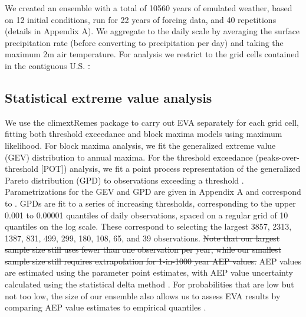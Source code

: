 \documentclass{ametsocV6.1}
\providecommand{\DIFadd}[1]{{\protect\color{blue}\uwave{#1}}} %
\providecommand{\DIFdel}[1]{{\protect\color{red}\sout{#1}}}                      %
\providecommand{\DIFaddbegin}{} %
\providecommand{\DIFaddend}{} %
\providecommand{\DIFdelbegin}{} %
\providecommand{\DIFdelend}{} %
\newcommand{\DIFscaledelfig}{0.5}
\newlength{\DIFdelgraphicswidth} %
\newlength{\DIFdelgraphicsheight} %
\newcommand{\DIFaddincludegraphics}[2][]{{\color{blue}\fbox{\DIFOincludegraphics[#1]{#2}}}} %
\newcommand{\DIFdelincludegraphics}[2][]{%
\sbox{\DIFdelgraphicsbox}{\DIFOincludegraphics[#1]{#2}}%
\settoboxwidth{\DIFdelgraphicswidth}{\DIFdelgraphicsbox} %
\settoboxtotalheight{\DIFdelgraphicsheight}{\DIFdelgraphicsbox} %
\scalebox{\DIFscaledelfig}{%
\parbox[b]{\DIFdelgraphicswidth}{\usebox{\DIFdelgraphicsbox}\\[-\baselineskip] \rule{\DIFdelgraphicswidth}{0em}}\llap{\resizebox{\DIFdelgraphicswidth}{\DIFdelgraphicsheight}{%
\setlength{\unitlength}{\DIFdelgraphicswidth}%
\begin{picture}(1,1)%
\thicklines\linethickness{2pt} %
{\color[rgb]{1,0,0}\put(0,0){\framebox(1,1){}}}%
{\color[rgb]{1,0,0}\put(0,0){\line( 1,1){1}}}%
{\color[rgb]{1,0,0}\put(0,1){\line(1,-1){1}}}%
\end{picture}%
}\hspace*{3pt}}} %
} %
\DeclareRobustCommand{\DIFaddbegin}{\DIFOaddbegin \let\includegraphics\DIFaddincludegraphics} %
\DeclareRobustCommand{\DIFaddend}{\DIFOaddend \let\includegraphics\DIFOincludegraphics} %
\DeclareRobustCommand{\DIFdelbegin}{\DIFOdelbegin \let\includegraphics\DIFdelincludegraphics} %
\DeclareRobustCommand{\DIFdelend}{\DIFOaddend \let\includegraphics\DIFOincludegraphics} %
\begin{document}
We created an ensemble with a total of 10560 years of emulated weather, based on 12 initial conditions, run for 22 years of forcing data, and 40 repetitions (details in Appendix A). We aggregate to the daily scale by averaging the surface precipitation rate (before converting to precipitation per day) and taking the maximum 2m air temperature. For analysis we restrict to the grid cells contained in the contiguous U.S. 
\DIFdelbegin \DIFdel{. 
}\DIFdelend 

\subsection{Statistical extreme value analysis}


We use the climextRemes package \citep{climextRemes} to carry out EVA separately for each grid cell, fitting both threshold exceedance and block maxima models using maximum likelihood. 
For block maxima analysis, we fit the generalized extreme value (GEV) distribution to annual maxima.
For the threshold exceedance (peaks-over-threshold [POT]) analysis, we fit a point process representation of the generalized Pareto distribution (GPD) to observations exceeding a threshold \citep[Section 7]{smith1989extreme,coles2001introduction}.
Parametrizations for the GEV and GPD are given in Appendix A and correspond to \cite{coles2001introduction}.
GPDs are fit to a series of increasing thresholds, corresponding to the upper 0.001 to 0.00001 quantiles of daily observations, spaced on a regular grid of 10 quantiles on the log scale. 
These correspond to selecting the largest 3857, 2313, 1387, 831, 499, 299, 180, 108, 65, and 39 observations. 
\DIFdelbegin \DIFdel{Note that our largest sample size still uses fewer than one observation per year, while our smallest sample size still requires extrapolation for 
1-in-1000 year AEP values.
}\DIFdelend AEP values are estimated using the parameter point estimates, with AEP value uncertainty calculated using the statistical delta method  \DIFaddbegin \DIFadd{on the MLE-based information matrix}\DIFaddend . 
For probabilities that are low but not too low, the size of our ensemble also allows us to assess EVA results by comparing AEP value estimates to empirical quantiles \citep[e.g.,][]{huang2016estimating}.
\end{document}
